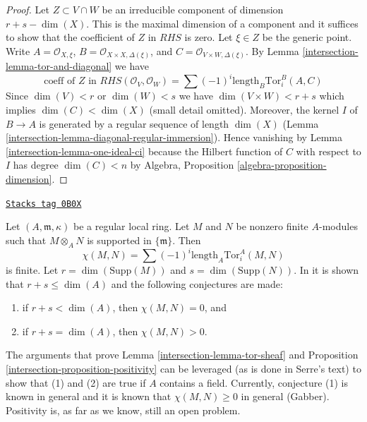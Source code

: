 \begin{proof}
\medskip\noindent
Let $Z \subset V \cap W$ be an irreducible component of dimension
$r + s - \dim(X)$. This is the maximal dimension of a component
and it suffices to show that the coefficient of $Z$ in $RHS$ is zero.
Let $\xi \in Z$ be the generic point. Write $A = \mathcal{O}_{X, \xi}$,
$B = \mathcal{O}_{X \times X, \Delta(\xi)}$, and
$C = \mathcal{O}_{V \times W, \Delta(\xi)}$.
By Lemma \ref{intersection-lemma-tor-and-diagonal} we have
$$
\text{coeff of }Z\text{ in }
RHS(\mathcal{O}_V, \mathcal{O}_W) =
\sum (-1)^i
\text{length}_B \text{Tor}_i^B(A, C)
$$
Since $\dim(V) < r$ or $\dim(W) < s$ we have $\dim(V \times W) < r + s$
which implies $\dim(C) < \dim(X)$ (small detail omitted). Moreover, the
kernel $I$ of $B \to A$ is generated by a regular sequence of
length $\dim(X)$ (Lemma \ref{intersection-lemma-diagonal-regular-immersion}).
Hence vanishing by Lemma \ref{intersection-lemma-one-ideal-ci} because
the Hilbert function of $C$ with respect to $I$ has degree $\dim(C) < n$
by Algebra, Proposition \ref{algebra-proposition-dimension}.
\end{proof}

\begin{remark}
\label{intersection-remark-Serre-conjectures}
\href{https://stacks.math.columbia.edu/tag/0B0X}{\texttt{Stacks tag 0B0X}}

Let $(A, \mathfrak m, \kappa)$ be a regular local ring.
Let $M$ and $N$ be nonzero finite $A$-modules such that $M \otimes_A N$
is supported in $\{\mathfrak m\}$. Then
$$
\chi(M, N) = \sum (-1)^i \text{length}_A \text{Tor}_i^A(M, N)
$$
is finite. Let $r = \dim(\text{Supp}(M))$ and $s = \dim(\text{Supp}(N))$.
In \cite{Serre_algebre_locale} it is shown that $r + s \leq \dim(A)$
and the following conjectures are made:
\begin{enumerate}
\item if $r + s < \dim(A)$, then $\chi(M, N) = 0$, and
\item if $r + s = \dim(A)$, then $\chi(M, N) > 0$.
\end{enumerate}
The arguments that prove Lemma \ref{intersection-lemma-tor-sheaf} and
Proposition \ref{intersection-proposition-positivity} can be leveraged
(as is done in Serre's text) to show that (1) and (2) are
true if $A$ contains a field. Currently, conjecture (1) is known
in general and it is known that $\chi(M, N) \geq 0$ in general (Gabber).
Positivity is, as far as we know, still an open problem.
\end{remark}

